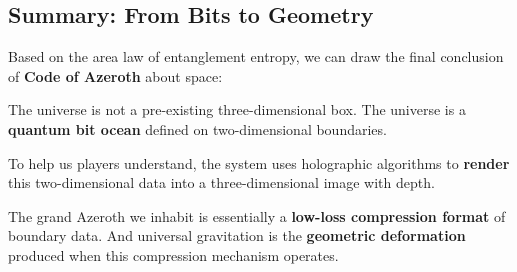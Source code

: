 \subsection{Summary: From Bits to Geometry}

Based on the area law of entanglement entropy, we can draw the final conclusion of \textbf{Code of Azeroth} about space:

The universe is not a pre-existing three-dimensional box.
The universe is a \textbf{quantum bit ocean} defined on two-dimensional boundaries.

To help us players understand, the system uses holographic algorithms to \textbf{render} this two-dimensional data into a three-dimensional image with depth.

The grand Azeroth we inhabit is essentially a \textbf{low-loss compression format} of boundary data. And universal gravitation is the \textbf{geometric deformation} produced when this compression mechanism operates.
